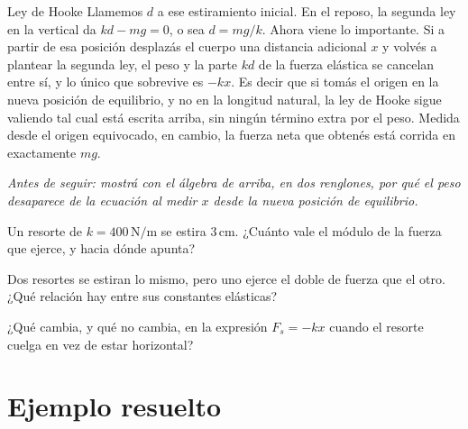 \documentclass[11pt,openany]{book}
\begin{document}
\begin{bloque}{Ley de Hooke}
Llamemos $d$ a ese estiramiento inicial. En el reposo, la segunda ley en la vertical da $kd - mg = 0$, o sea $d = mg/k$. Ahora viene lo importante. Si a partir de esa posición desplazás el cuerpo una distancia adicional $x$ y volvés a plantear la segunda ley, el peso y la parte $kd$ de la fuerza elástica se cancelan entre sí, y lo único que sobrevive es $-kx$. Es decir que si tomás el origen en la nueva posición de equilibrio, y no en la longitud natural, la ley de Hooke sigue valiendo tal cual está escrita arriba, sin ningún término extra por el peso. Medida desde el origen equivocado, en cambio, la fuerza neta que obtenés está corrida en exactamente $mg$.

\textit{Antes de seguir: mostrá con el álgebra de arriba, en dos renglones, por qué el peso desaparece de la ecuación al medir $x$ desde la nueva posición de equilibrio.}
\end{bloque}

\begin{chequeo}
\item Un resorte de $k = 400\,\mathrm{N/m}$ se estira $3\,\mathrm{cm}$. ¿Cuánto vale el módulo de la fuerza que ejerce, y hacia dónde apunta?
\item Dos resortes se estiran lo mismo, pero uno ejerce el doble de fuerza que el otro. ¿Qué relación hay entre sus constantes elásticas?
\item ¿Qué cambia, y qué no cambia, en la expresión $F_s = -kx$ cuando el resorte cuelga en vez de estar horizontal?
\end{chequeo}

\section{Ejemplo resuelto}
\end{document}
